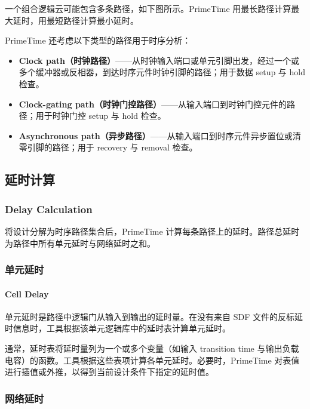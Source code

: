 一个组合逻辑云可能包含多条路径，如下图所示。PrimeTime 用最长路径计算最大延时，用最短路径计算最小延时。


PrimeTime 还考虑以下类型的路径用于时序分析：
\begin{itemize}
  \item \textbf{Clock path（时钟路径）}——从时钟输入端口或单元引脚出发，经过一个或多个缓冲器或反相器，到达时序元件时钟引脚的路径；用于数据 setup 与 hold 检查。
  \item \textbf{Clock-gating path（时钟门控路径）}——从输入端口到时钟门控元件的路径；用于时钟门控 setup 与 hold 检查。
  \item \textbf{Asynchronous path（异步路径）}——从输入端口到时序元件异步置位或清零引脚的路径；用于 recovery 与 removal 检查。
\end{itemize}


\subsection{延时计算}
\subsubsection*{Delay Calculation}

将设计分解为时序路径集合后，PrimeTime 计算每条路径上的延时。路径总延时为路径中所有单元延时与网络延时之和。

\subsubsection{单元延时}
\paragraph*{Cell Delay}

单元延时是路径中逻辑门从输入到输出的延时量。在没有来自 SDF 文件的反标延时信息时，工具根据该单元逻辑库中的延时表计算单元延时。

通常，延时表将延时量列为一个或多个变量（如输入 transition time 与输出负载电容）的函数。工具根据这些表项计算各单元延时。必要时，PrimeTime 对表值进行插值或外推，以得到当前设计条件下指定的延时值。

\subsubsection{网络延时}

